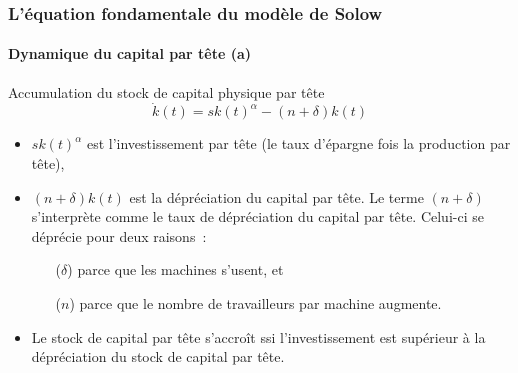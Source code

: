 \documentclass[10pt,notheorems]{beamer}
\theoremstyle{plain}
\theoremstyle{definition} %
\begin{document}
\begin{frame}
  \frametitle{L'équation fondamentale du modèle de Solow}
  \framesubtitle{Dynamique du capital par tête (a)}

  \bigskip

  \begin{block}{Accumulation du stock de capital physique par tête}
    \[
      \dot k(t) =  s k(t)^{\alpha} -  (n+\delta) k(t)
    \]
  \end{block}

  \bigskip

  \begin{itemize}

  \item $s k(t)^{\alpha}$ est l'investissement par tête (le taux d'épargne fois la production par tête),\newline

  \item $(n+\delta)k(t)$ est la dépréciation du capital par tête. Le terme $(n+\delta)$ s'interprète comme le taux de dépréciation du capital par tête. Celui-ci se déprécie pour deux raisons~:\newline

    \begin{itemize}
    \item[($\delta$)] parce que les machines s'usent, et
    \item[($n$)] parce que le nombre de travailleurs par machine augmente.
    \end{itemize}

    \bigskip

  \item Le stock de capital par tête s'accroît ssi l'investissement
    est supérieur à la dépréciation du stock de capital par tête.
  \end{itemize}

\end{frame}
\end{document}
